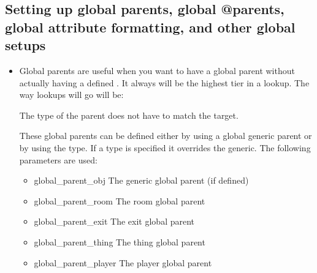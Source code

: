 \documentclass[letterpaper,10pt,english]{sphinxmanual}
\begin{document}
\subsection{Setting up global parents, global @parents, global attribute formatting, and other global setups}
\label{\detokenize{features:setting-up-global-parents-global-parents-global-attribute-formatting-and-other-global-setups}}\begin{itemize}
\item {} 
\sphinxAtStartPar
Global parents are useful when you want to have a global \textquotesingle{}parent\textquotesingle{}
without actually having a defined \textquotesingle{}.  It always will be the
highest tier in a lookup.  The way lookups will go will be:

\begin{sphinxVerbatim}[commandchars=\\\{\}]
\end{sphinxVerbatim}

\sphinxAtStartPar
The type of the parent does not have to match the target.

\sphinxAtStartPar
These global parents can be defined either by using a global
generic parent or by using the type.  If a type is specified it
overrides the generic.  The following parameters are used:
\begin{itemize}
\item {} 
\sphinxAtStartPar
global\_parent\_obj     \sphinxhyphen{} The generic global parent (if defined)

\item {} 
\sphinxAtStartPar
global\_parent\_room    \sphinxhyphen{} The room global parent

\item {} 
\sphinxAtStartPar
global\_parent\_exit    \sphinxhyphen{} The exit global parent

\item {} 
\sphinxAtStartPar
global\_parent\_thing   \sphinxhyphen{} The thing global parent

\item {} 
\sphinxAtStartPar
global\_parent\_player  \sphinxhyphen{} The player global parent

\end{itemize}


\end{itemize}
\end{document}
